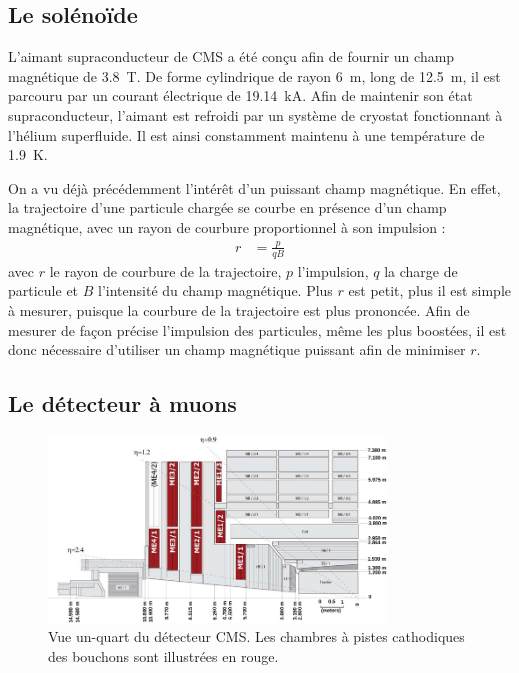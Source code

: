 
\subsection{Le solénoïde}

L'aimant supraconducteur de CMS a été conçu afin de fournir un champ magnétique de \SI{3.8}{\tesla}. De forme cylindrique de rayon \SI{6}{\m}, long de \SI{12.5}{\meter}, il est parcouru par un courant électrique de \SI{19.14}{\kilo\ampere}. Afin de maintenir son état supraconducteur, l'aimant est refroidi par un système de cryostat fonctionnant à l'hélium superfluide. Il est ainsi constamment maintenu à une température de \SI{1.9}{\kelvin}.

On a vu déjà précédemment l'intérêt d'un puissant champ magnétique. En effet, la trajectoire d'une particule chargée se courbe en présence d'un champ magnétique, avec un rayon de courbure proportionnel à son impulsion :
\begin{align*}
  r &= \frac{p}{qB}
\end{align*}
avec $r$ le rayon de courbure de la trajectoire, $p$ l'impulsion, $q$ la charge de particule et $B$ l'intensité du champ magnétique. Plus $r$ est petit, plus il est simple à mesurer, puisque la courbure de la trajectoire est plus prononcée. Afin de mesurer de façon précise l'impulsion des particules, même les plus boostées, il est donc nécessaire d'utiliser un champ magnétique puissant afin de minimiser $r$.

\subsection{Le détecteur à muons}

\begin{figure}[tb] \centering
  \includegraphics[width=0.8\textwidth]{chapitre2/figs/CSC.pdf}
  \caption{Vue un-quart du détecteur CMS. Les chambres à pistes cathodiques des bouchons sont illustrées en rouge.}
  \label{fig:cms_csc}
\end{figure}


